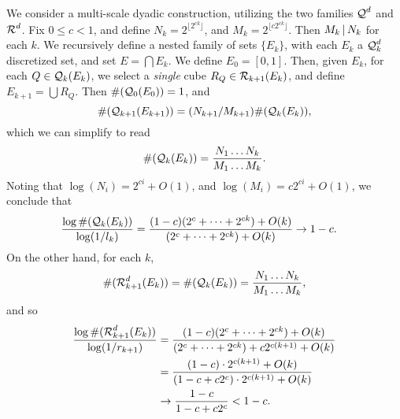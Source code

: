\begin{example}
	We consider a multi-scale dyadic construction, utilizing the two families $\operatorname{\mathcal{Q}}^d$ and $\operatorname{\mathcal{R}}^d$. Fix $0 \leq c < 1$, and define $N_k = 2^{\lfloor 2^{ck} \rfloor}$, and $M_k = 2^{\lfloor c 2^{ck} \rfloor}$. Then $M_k \operatorname{\mid} N_k$ for each $k$. We recursively define a nested family of sets $\{ E_k \}$, with each $E_k$ a $\operatorname{\mathcal{Q}}_k^d$ discretized set, and set $E = \bigcap E_k$. We define $E_0 = [0,1]$. Then, given $E_k$, for each $Q \in \operatorname{\mathcal{Q}}_k(E_k)$, we select a \emph{single} cube $R_Q \in \operatorname{\mathcal{R}}_{k+1}(E_k)$, and define $E_{k+1} = \bigcup R_Q$. Then $\#(\operatorname{\mathcal{Q}}_0(E_0)) = 1$, and
	\[ \#(\operatorname{\mathcal{Q}}_{k+1}(E_{k+1})) = (N_{k+1}/M_{k+1}) \#(\operatorname{\mathcal{Q}}_k(E_k)), \]
	which we can simplify to read
	\begin{equation} \label{equation12623} \#(\operatorname{\mathcal{Q}}_k(E_k)) = \frac{N_1 \dots N_k}{M_1 \dots M_k}. \end{equation}
	Noting that $\log(N_i) = 2^{ci} + O(1)$, and $\log(M_i) = c2^{ci} + O(1)$, we conclude that
	\begin{align*}
		\frac{\log \#(\operatorname{\mathcal{Q}}_k(E_k))}{\log(1/l_k)} &= \frac{(1-c)(2^c + \dots + 2^{ck}) + O(k)}{(2^c + \dots + 2^{ck}) + O(k)} \to 1-c.
	\end{align*}
	On the other hand, for each $k$,
	\[ \#(\operatorname{\mathcal{R}}_{k+1}^d(E_k)) = \#(\operatorname{\mathcal{Q}}_k(E_k)) = \frac{N_1 \dots N_k}{M_1 \dots M_k}, \]
	and so
	\begin{align*}
		\frac{\log \#(\operatorname{\mathcal{R}}_{k+1}^d(E_k))}{\log(1/r_{k+1})} &= \frac{(1-c)(2^c + \dots + 2^{ck}) + O(k)}{(2^c + \dots + 2^{ck}) + c2^{c(k+1)} + O(k)} \\
		&= \frac{(1-c) \cdot 2^{c(k+1)} + O(k)}{(1 - c + c 2^c) \cdot 2^{c(k+1)} + O(k)}\\
		&\to \frac{1 - c}{1 - c + c2^c} < 1 - c.
	\end{align*}
%
%

\end{example}

